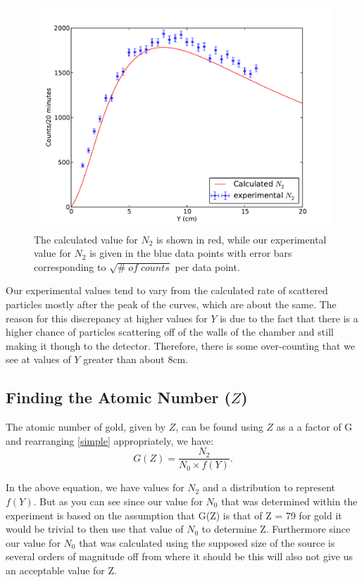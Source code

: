 \begin{figure}[H]
\begin{center}
\includegraphics[width=5in]{N2.pdf}
\caption{The calculated value for $N_2$ is shown in red, while our experimental value for $N_2$ is given in the blue data points with error bars corresponding to $\sqrt{\#\; of\; counts}$ per data point.}
\end{center}
\end{figure}
Our experimental values tend to vary from the calculated rate of scattered particles mostly after the peak of the curves, which are about the same. The reason for this discrepancy at higher values for $Y$ is due to the fact that there is a higher chance of particles scattering off of the walls of the chamber and still making it though to the detector. Therefore, there is some over-counting that we see at values of $Y$ greater than about 8cm.

\subsection{Finding the Atomic Number ($Z$)}
The atomic number of gold, given by $Z$, can be found using $Z$ as a a factor of G and rearranging \ref{simple} appropriately, we have: 
\begin{equation}G(Z)= \frac{N_2}{N_0 \times f(Y)}. \end {equation} 

In the above equation, we have values for $N_2$ and a distribution to represent $f(Y)$.  But as you can see since our value for $N_0$ that was determined within the experiment is based on the assumption that G(Z) is that of Z = 79 for gold it would be trivial to then use that value of $N_0$ to determine Z.  Furthermore since our value for $N_0$ that was calculated using the supposed size of the source is several orders of magnitude off from where it should be this will also not give us an acceptable value for Z.  

